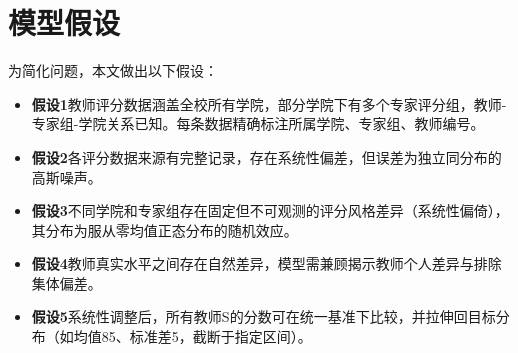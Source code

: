 \documentclass[withoutpreface,bwprint]{cumcmthesis}
\begin{document}

\section{模型假设}

为简化问题，本文做出以下假设：

\begin{itemize}[itemindent=2em]

\item \textbf{假设1}教师评分数据涵盖全校所有学院，部分学院下有多个专家评分组，教师-专家组-学院关系已知。每条数据精确标注所属学院、专家组、教师编号。
\item \textbf{假设2}各评分数据来源有完整记录，存在系统性偏差，但误差为独立同分布的高斯噪声。
\item \textbf{假设3}不同学院和专家组存在固定但不可观测的评分风格差异（系统性偏倚），其分布为服从零均值正态分布的随机效应。
\item \textbf{假设4}教师真实水平之间存在自然差异，模型需兼顾揭示教师个人差异与排除集体偏差。
\item \textbf{假设5}系统性调整后，所有教师S的分数可在统一基准下比较，并拉伸回目标分布（如均值85、标准差5，截断于指定区间）。
\end{itemize}



\end{document}
